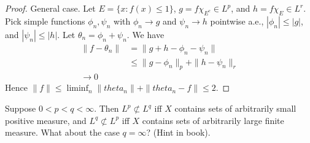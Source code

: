 \documentclass{article}
\begin{document}
\begin{proof}
General case. Let $E = \{x : f(x) \le 1\}$, $g = f \chi_{E^c} \in L^p$, and $h = f \chi_E \in L^r$. Pick simple functions $\phi_n, \psi_n$ with $\phi_n \to g$ and $\psi_n \to h$ pointwise a.e., $|\phi_n| \le |g|$, and $|\psi_n| \le |h|$.  Let $\theta_n = \phi_n + \psi_n$.  We have
\begin{align*}
\|f - \theta_n \| & = \|g + h - \phi_n - \psi_n\|
\\ & \le \|g - \phi_n\|_p + \|h - \psi_n\|_r
\\ \to 0
\end{align*} 
Hence $\|f\| \le \liminf_n \|theta_n\| + \|theta_n - f\| \le 2$. 
\end{proof}


 Suppose $0 < p < q < \infty$. Then $L^p \not\subset L^q$ iff $X$ contains sets of arbitrarily small positive measure, and $L^q \not \subset L^p$ iff $X$ contains sets of arbitrarily large finite measure. What about the case $q = \infty$? (Hint in book).
\end{document}

